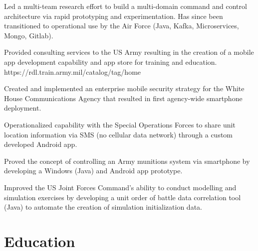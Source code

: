 \documentclass[]{deedy-resume-openfont}
\begin{document}
\sectionsep
{}\hfill {}
\begin{tightemize}
	\item Led a multi-team research effort to build a multi-domain command and control architecture via rapid prototyping and experimentation. Has since been transitioned to operational use by the Air Force (Java, Kafka, Microservices, Mongo, Gitlab).
	\item Provided consulting services to the US Army resulting in the creation of a mobile app development capability and app store for training and education.  https://rdl.train.army.mil/catalog/tag/home
\end{tightemize}
\sectionsep
{}\hfill {}
\begin{tightemize}
	\item Created and implemented an enterprise mobile security strategy for the White House Communications Agency that resulted in first agency-wide smartphone deployment.
	\item Operationalized capability with the Special Operations Forces to share unit location information via SMS (no cellular data network) through a custom developed Android app.
	\item Proved the concept of controlling an Army munitions system via smartphone by developing a Windows (Java) and Android app prototype.
\end{tightemize}
\sectionsep
{}\hfill {}
\begin{tightemize}
	\item Improved the US Joint Forces Command's ability to conduct modelling and simulation exercises by developing a unit order of battle data correlation tool (Java) to automate the creation of simulation initialization data.
\end{tightemize}
\sectionsep


%
%
\section{Education}
\raggedright
\end{document}
